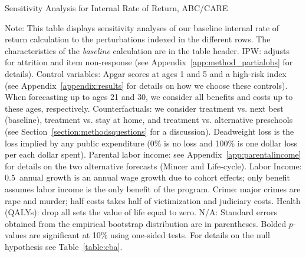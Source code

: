 \begin{table}
\begin{threeparttable}
\caption{Sensitivity Analysis for Internal Rate of Return, ABC/CARE}
\label{table:irrsens}
\centering
\scriptsize

\begin{tablenotes}
\scriptsize
\item Note: This table displays sensitivity analyses of our baseline internal rate of return calculation to the perturbations indexed in the different rows. The characteristics of the \textit{baseline} calculation are in the table header. IPW: adjusts for attrition and item non-response (see  Appendix~\ref{app:method_partialobs} for details). Control variables: Apgar scores at ages 1 and 5 and a high-risk index (see  Appendix~\ref{appendix:results} for details on how we choose these controls). When forecasting up to ages 21 and 30, we consider all benefits and costs up to these ages, respectively. Counterfactuals: we consider treatment vs. next best (baseline), treatment vs. stay at home, and treatment vs. alternative preschools (see Section~\ref{section:methodsquestions} for a discussion). Deadweight loss is the loss implied by any public expenditure (0\% is no loss and 100\% is one dollar loss per each dollar spent). Parental labor income: see  Appendix~\ref{app:parentalincome} for details on the two alternative forecasts (Mincer and Life-cycle). Labor Income: 0.5\ annual growth is an annual wage growth due to cohort effects; only benefit assumes labor income is the only benefit of the program. Crime: major crimes are rape and murder; half costs takes half of victimization and judiciary costs. Health (QALYs): drop all sets the value of life equal to zero. N/A: Standard errors obtained from the empirical bootstrap distribution are in parentheses. Bolded $p$-values are significant at 10\% using one-sided tests. For details on the null hypothesis see Table~\ref{table:cba}.
\end{tablenotes}
\end{threeparttable}
\end{table}
\doublespacing

